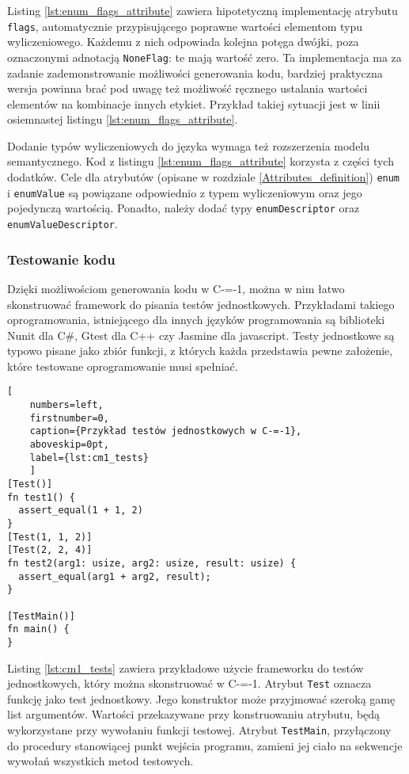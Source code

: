 Listing \ref{lst:enum_flags_attribute} zawiera hipotetyczną implementację atrybutu \lstinline{flags}, automatycznie przypisującego poprawne wartości elementom typu wyliczeniowego.
Każdemu z nich odpowiada kolejna potęga dwójki, poza oznaczonymi adnotacją \lstinline{NoneFlag}: te mają wartość zero.
Ta implementacja ma za zadanie zademonstrowanie możliwości generowania kodu, bardziej praktyczna wersja powinna brać pod uwagę też możliwość ręcznego ustalania wartości elementów na kombinacje innych etykiet.
Przykład takiej sytuacji jest w linii osiemnastej listingu \ref{lst:enum_flags_attribute}.

Dodanie typów wyliczeniowych do języka wymaga też rozszerzenia modelu semantycznego.
Kod z listingu \ref{lst:enum_flags_attribute} korzysta z części tych dodatków.
Cele dla atrybutów (opisane w rozdziale \ref{Attributes_definition}) \lstinline{enum} i \lstinline{enumValue} są powiązane odpowiednio z typem wyliczeniowym oraz jego pojedynczą wartością.
Ponadto, należy dodać typy \lstinline{enumDescriptor} oraz \lstinline{enumValueDescriptor}.

\subsubsection{Testowanie kodu}

Dzięki możliwościom generowania kodu w C-=-1, można w nim łatwo skonstruować framework do pisania testów jednostkowych.
Przykładami takiego oprogramowania, istniejącego dla innych języków programowania są biblioteki Nunit dla C\#, Gtest dla C++ czy Jasmine dla javascript.
Testy jednostkowe są typowo pisane jako zbiór funkcji, z których każda przedstawia pewne założenie, które testowane oprogramowanie musi spełniać.

\begin{minipage}{\textwidth}
  \begin{lstlisting}[
    numbers=left,
    firstnumber=0,
    caption={Przykład testów jednostkowych w C-=-1},
    aboveskip=0pt,
    label={lst:cm1_tests}
    ]
[Test()]
fn test1() {
  assert_equal(1 + 1, 2)
}
[Test(1, 1, 2)]
[Test(2, 2, 4)]
fn test2(arg1: usize, arg2: usize, result: usize) {
  assert_equal(arg1 + arg2, result);
}

[TestMain()]
fn main() {
}
  \end{lstlisting}
\end{minipage}

Listing \ref{lst:cm1_tests} zawiera przykładowe użycie frameworku do testów jednostkowych, który można skonstruować w C-=-1.
Atrybut \lstinline{Test} oznacza funkcję jako test jednostkowy.
Jego konstruktor może przyjmować szeroką gamę list argumentów.
Wartości przekazywane przy konstruowaniu atrybutu, będą wykorzystane przy wywołaniu funkcji testowej.
Atrybut \lstinline{TestMain}, przyłączony do procedury stanowiącej punkt wejścia programu, zamieni jej ciało na sekwencje wywołań wszystkich metod testowych.


